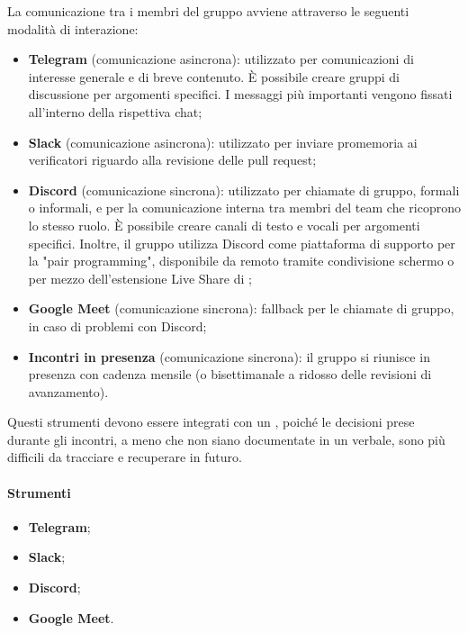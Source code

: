 \par La comunicazione tra i membri del gruppo avviene attraverso le seguenti modalità di interazione:
\begin{itemize}
  \item \textbf{Telegram} (comunicazione asincrona): utilizzato per comunicazioni di interesse generale e di breve contenuto. È possibile creare gruppi di discussione per argomenti specifici. I messaggi più importanti vengono fissati all'interno della rispettiva chat;
  \item \textbf{Slack} (comunicazione asincrona): utilizzato per inviare promemoria ai verificatori riguardo alla revisione delle pull request;
  \item \textbf{Discord} (comunicazione sincrona): utilizzato per chiamate di gruppo, formali o informali, e per la comunicazione interna tra membri del team che ricoprono lo stesso ruolo. È possibile creare canali di testo e vocali per argomenti specifici. Inoltre, il gruppo utilizza Discord come piattaforma di supporto per la "pair programming", disponibile da remoto tramite condivisione schermo o per mezzo dell'estensione Live Share di ;
  \item \textbf{Google Meet} (comunicazione sincrona): fallback per le chiamate di gruppo, in caso di problemi con Discord;
  \item \textbf{Incontri in presenza} (comunicazione sincrona): il gruppo si riunisce in presenza con cadenza mensile (o bisettimanale a ridosso delle revisioni di avanzamento).
\end{itemize}

\vspace{0.5\baselineskip}
\par Questi strumenti devono essere integrati con un , poiché le decisioni prese durante gli incontri, a meno che non siano documentate in un verbale, sono più difficili da tracciare e recuperare in futuro.

\paragraph*{Strumenti}
\begin{itemize}
  \item \textbf{Telegram};
  \item \textbf{Slack};
  \item \textbf{Discord};
  \item \textbf{Google Meet}.
\end{itemize}

